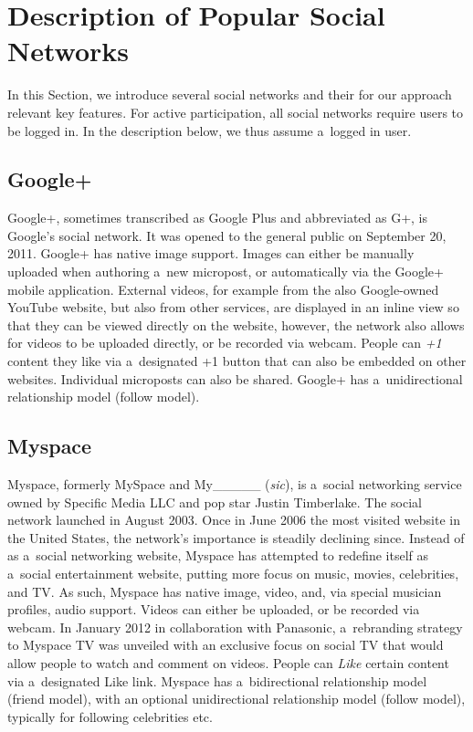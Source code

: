 \section{Description of Popular Social Networks}
In this Section, we introduce several social networks
and their for our approach relevant key features.
For active participation, all social networks require users to be logged in.
In the description below, we thus assume a~logged in user.

\subsection{Google+}
Google+, sometimes transcribed as Google Plus and abbreviated as G+, is Google's social network.
It was opened to the general public on September 20, 2011.
Google+ has native image support.
Images can either be manually uploaded when authoring a~new micropost,
or automatically via the Google+ mobile application.
External videos, for example from the also Google-owned YouTube website,
but also from other services, are displayed in an inline view
so that they can be viewed directly on the website,
however, the network also allows for videos to be uploaded directly,
or be recorded via webcam.
People can \emph{+1} content they like via a~designated +1 button
that can also be embedded on other websites.
Individual microposts can also be shared.
Google+ has a~unidirectional relationship model (follow model).

\subsection{Myspace}
Myspace, formerly MySpace and My\_\_\_\_\_ (\emph{sic}), is a~social networking service owned by Specific Media LLC and pop star Justin Timberlake.
The social network launched in August 2003.
Once in June 2006 the most visited website in the United States, the network's importance
is steadily declining since.
Instead of as a~social networking website,
Myspace has attempted to redefine itself as a~social entertainment website,
putting more focus on music, movies, celebrities, and TV.
As such, Myspace has native image, video, and, via special musician profiles, audio support.
Videos can either be uploaded, or be recorded via webcam.
In January 2012 in collaboration with Panasonic, a~rebranding strategy to Myspace TV was unveiled
with an exclusive focus on social TV that would allow people  to watch and comment on videos.
People can \emph{Like} certain content via a~designated Like link.
Myspace has a~bidirectional relationship model (friend model),
with an optional unidirectional relationship model (follow model),
typically for following celebrities etc.

